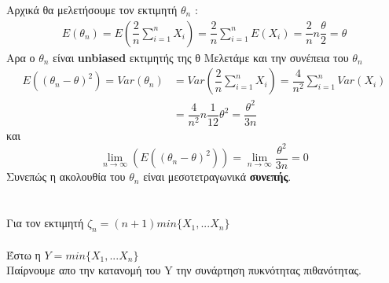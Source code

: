 \documentclass{article}
\begin{document}
Αρχικά θα μελετήσουμε τον εκτιμητή $\theta_{n}$ :
\*
\begin{align*}
E(\theta_{n})=E(\dfrac{2}{n}\sum_{i=1}^{n} X_{i})=\dfrac{2}{n}\sum_{i=1}^{n}E( X_{i})=\dfrac{2}{n}n\dfrac{\theta}{2}=\theta
\end{align*}
Αρα ο $\theta_{n}$ είναι \textbf{unbiased }εκτιμητής της θ
\*
Μελετάμε και την συνέπεια του $\theta_{n}$ 
\\
\begin{align*}
E((\theta_{n}-\theta)^{2})=Var(\theta_{n}) &=Var(\dfrac{2}{n}\sum_{i=1}^{n} X_{i})=\dfrac{4}{n^{2}}\sum_{i=1}^{n} Var(X_{i}) \\
&=\dfrac{4}{n^{2}}n\dfrac{1}{12}\theta^{2}=\dfrac{\theta^{2}}{3n}
\end{align*}
\*
και \[ \lim_{n \to \infty}(E((\theta_{n}-\theta)^{2}))=\lim_{n \to \infty}\dfrac{\theta^{2}}{3n}=0 \]
\* 
Συνεπώς η ακολουθία του $\theta_{n}$ είναι μεσοτετραγωνικά \textbf{συνεπής}.
\\
\\
\paragraph*{}
Για τον εκτιμητή $\zeta_{n}=(n+1)min\lbrace X_{1},...X_{n} \rbrace$ 
\\
\\
Έστω η $ Y=min\lbrace X_{1},...X_{n} \rbrace $ 
\\
Παίρνουμε απο την κατανομή του Y την συνάρτηση πυκνότητας πιθανότητας.
\end{document}

